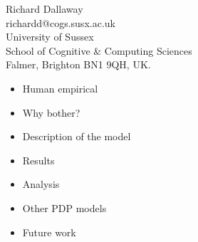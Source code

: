 


\newcommand{\x}[2]{\mbox{$#1\times#2$}}




\begin{slide*}


\begin{center}
\large
Richard Dallaway\\
\normalsize
richardd@cogs.susx.ac.uk\bigskip\\

University of Sussex\\
School of Cognitive \& Computing Sciences\\
Falmer, Brighton BN1 9QH, UK.\bigskip\\

\vspace{1cm}


\end{center}
\end{slide*}

\begin{slide*}
\vspace{1 true cm}
\begin{center}
\begin{minipage}{5cm}
\begin{itemize}
\item Human empirical
\item Why bother?
\item Description of the model
\item Results
\item Analysis
\item Other PDP models
\item Future work
\end{itemize}
\end{minipage}
\end{center}

\end{slide*}


